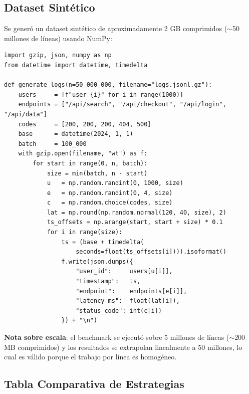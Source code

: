 \documentclass[10pt,a4paper]{article}
\begin{document}
\subsection{Dataset Sint\'etico}

Se gener\'o un dataset sint\'etico de aproximadamente 2 GB comprimidos
($\sim$50 millones de l\'ineas) usando NumPy:

\begin{lstlisting}[style=python, caption={Generaci\'on de dataset sint\'etico.}]
import gzip, json, numpy as np
from datetime import datetime, timedelta

def generate_logs(n=50_000_000, filename="logs.jsonl.gz"):
    users     = [f"user_{i}" for i in range(1000)]
    endpoints = ["/api/search", "/api/checkout", "/api/login", "/api/data"]
    codes     = [200, 200, 200, 404, 500]
    base      = datetime(2024, 1, 1)
    batch     = 100_000
    with gzip.open(filename, "wt") as f:
        for start in range(0, n, batch):
            size = min(batch, n - start)
            u   = np.random.randint(0, 1000, size)
            e   = np.random.randint(0, 4, size)
            c   = np.random.choice(codes, size)
            lat = np.round(np.random.normal(120, 40, size), 2)
            ts_offsets = np.arange(start, start + size) * 0.1
            for i in range(size):
                ts = (base + timedelta(
                    seconds=float(ts_offsets[i]))).isoformat()
                f.write(json.dumps({
                    "user_id":     users[u[i]],
                    "timestamp":   ts,
                    "endpoint":    endpoints[e[i]],
                    "latency_ms":  float(lat[i]),
                    "status_code": int(c[i])
                }) + "\n")
\end{lstlisting}

\textbf{Nota sobre escala}: el benchmark se ejecut\'o sobre 5 millones de
l\'ineas ($\sim$200 MB comprimidos) y los resultados se extrapolan linealmente
a 50 millones, lo cual es v\'alido porque el trabajo por l\'inea es homog\'eneo.

\subsection{Tabla Comparativa de Estrategias}
\end{document}
